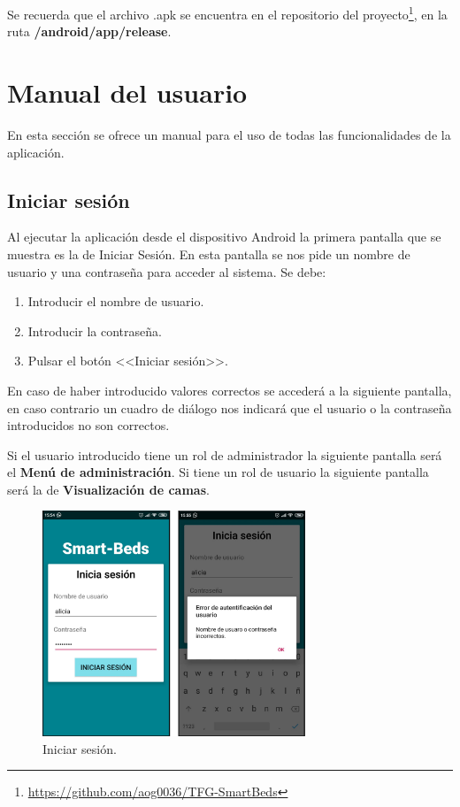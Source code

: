 Se recuerda que el archivo .apk se encuentra en el repositorio del proyecto\footnote{\url{https://github.com/aog0036/TFG-SmartBeds}}, en la ruta \textbf{/android/app/release}.

\section{Manual del usuario}

En esta sección se ofrece un manual para el uso de todas las funcionalidades de la aplicación. 

\subsection{Iniciar sesión}

Al ejecutar la aplicación desde el dispositivo Android la primera pantalla que se muestra es la de Iniciar Sesión. En esta pantalla se nos pide un nombre de usuario y una contraseña para acceder al sistema. Se debe: 

\begin{enumerate}
	\item Introducir el nombre de usuario. 
	\item Introducir la contraseña. 
	\item Pulsar el botón <<Iniciar sesión>>. 
\end{enumerate}

En caso de haber introducido valores correctos se accederá a la siguiente pantalla, en caso contrario un cuadro de diálogo nos indicará que el usuario o la contraseña introducidos no son correctos. 

Si el usuario introducido tiene un rol de administrador la siguiente pantalla será el \textbf{Menú de administración}. Si tiene un rol de usuario la siguiente pantalla será la de \textbf{Visualización de camas}. 

\begin{figure}[H]
	\centering
	\includegraphics[width=0.7\textwidth]{../img/iniciasesion.png}
	\caption{Iniciar sesión.}
	\label{fig:iniciasesion}
\end{figure}

